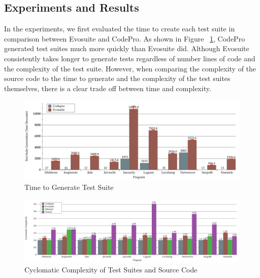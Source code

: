 \subsection{Experiments and Results}

In the experiments, we first evaluated the time to create each test suite in comparison between Evosuite and CodePro. As shown in Figure ~\ref{fig:Time}, CodePro generated test suites much more quickly than Evosuite did. Although Evosuite consistently takes longer to generate tests regardless of number lines of code and the complexity of the test suite. However, when comparing the complexity of the source code to the time to generate and the complexity of the test suites themselves, there is a clear trade off between time and complexity.

\begin{figure}[!t]
\centering
  \includegraphics[width=\linewidth]{Time}
    \caption{Time to Generate Test Suite}
  \label{fig:Time}
\end{figure}

\begin{figure}[!t]
\centering
  \includegraphics[width=\linewidth]{Complexity}
   \caption{Cyclomatic Complexity of Test Suites and Source Code}
  \label{fig:Complexity}
\end{figure}

